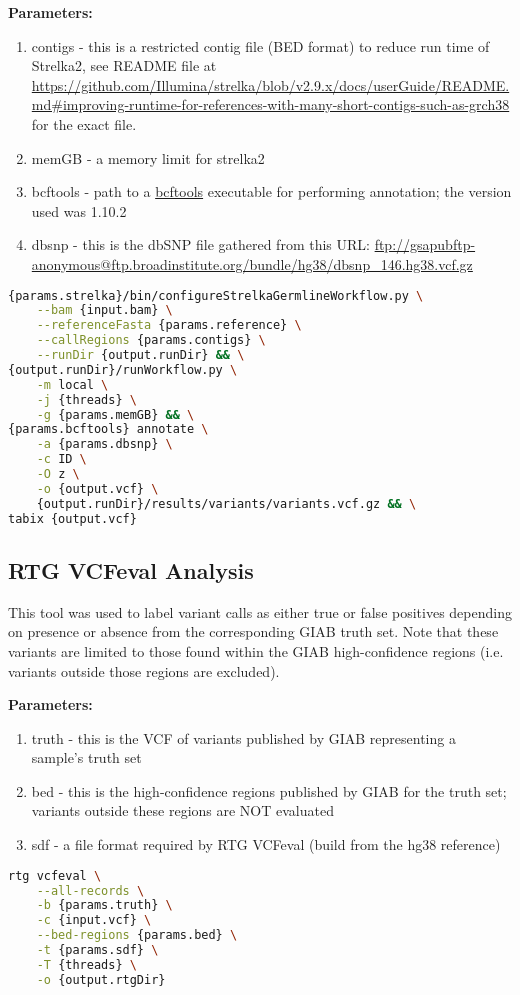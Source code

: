 \noindent\textbf{Parameters:}
\begin{enumerate}
    \item contigs - this is a restricted contig file (BED format) to reduce run time of Strelka2, see README file at \url{https://github.com/Illumina/strelka/blob/v2.9.x/docs/userGuide/README.md#improving-runtime-for-references-with-many-short-contigs-such-as-grch38} for the exact file.
    \item memGB - a memory limit for strelka2
    \item bcftools - path to a \href{http://samtools.github.io/bcftools/bcftools.html}{bcftools} executable for performing annotation; the version used was 1.10.2
    \item dbsnp - this is the dbSNP file gathered from this URL: \url{ftp://gsapubftp-anonymous@ftp.broadinstitute.org/bundle/hg38/dbsnp_146.hg38.vcf.gz}
\end{enumerate}

\begin{lstlisting}[language=bash]
{params.strelka}/bin/configureStrelkaGermlineWorkflow.py \
    --bam {input.bam} \
    --referenceFasta {params.reference} \
    --callRegions {params.contigs} \
    --runDir {output.runDir} && \
{output.runDir}/runWorkflow.py \
    -m local \
    -j {threads} \
    -g {params.memGB} && \
{params.bcftools} annotate \
    -a {params.dbsnp} \
    -c ID \
    -O z \
    -o {output.vcf} \
    {output.runDir}/results/variants/variants.vcf.gz && \
tabix {output.vcf}
\end{lstlisting}

\subsection{RTG VCFeval Analysis}
\label{sec:rtg_vcfeval}
This tool was used to label variant calls as either true or false positives depending on presence or absence from the corresponding GIAB truth set. Note that these variants are limited to those found within the GIAB high-confidence regions (i.e. variants outside those regions are excluded).

\noindent\textbf{Parameters:}
\begin{enumerate}
    \item truth - this is the VCF of variants published by GIAB representing a sample's truth set
    \item bed - this is the high-confidence regions published by GIAB for the truth set; variants outside these regions are NOT evaluated
    \item sdf - a file format required by RTG VCFeval (build from the hg38 reference)
\end{enumerate}

\begin{lstlisting}[language=bash]
rtg vcfeval \
    --all-records \
    -b {params.truth} \
    -c {input.vcf} \
    --bed-regions {params.bed} \
    -t {params.sdf} \
    -T {threads} \
    -o {output.rtgDir}
\end{lstlisting}